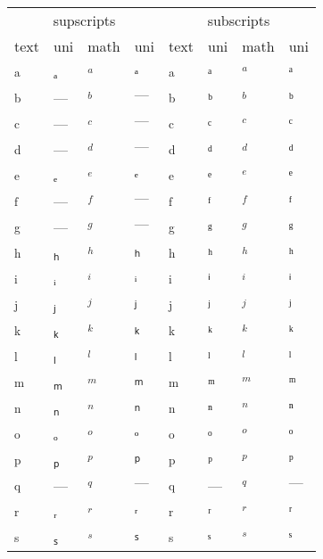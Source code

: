 \documentclass{standalone}
\begin{document}
\begin{tabular}{ll|ll|ll|ll}  %
\toprule
\multicolumn{4}{c|}{supscripts} & \multicolumn{4}{|c}{subscripts} \\
text & uni & math & uni & text & uni & math & uni \\
\midrule
\textsubscript{a} & ₐ & $_{a}$ & $ₐ$ & \textsuperscript{a} & ᵃ & $^{a}$ & $ᵃ$ \\
\textsubscript{b} & — & $_{b}$ & $—$ & \textsuperscript{b} & ᵇ & $^{b}$ & $ᵇ$ \\
\textsubscript{c} & — & $_{c}$ & $—$ & \textsuperscript{c} & ᶜ & $^{c}$ & $ᶜ$ \\
\textsubscript{d} & — & $_{d}$ & $—$ & \textsuperscript{d} & ᵈ & $^{d}$ & $ᵈ$ \\
\textsubscript{e} & ₑ & $_{e}$ & $ₑ$ & \textsuperscript{e} & ᵉ & $^{e}$ & $ᵉ$ \\
\textsubscript{f} & — & $_{f}$ & $—$ & \textsuperscript{f} & ᶠ & $^{f}$ & $ᶠ$ \\
\textsubscript{g} & — & $_{g}$ & $—$ & \textsuperscript{g} & ᵍ & $^{g}$ & $ᵍ$ \\
\textsubscript{h} & ₕ & $_{h}$ & $ₕ$ & \textsuperscript{h} & ʰ & $^{h}$ & $ʰ$ \\
\textsubscript{i} & ᵢ & $_{i}$ & $ᵢ$ & \textsuperscript{i} & ⁱ & $^{i}$ & $ⁱ$ \\
\textsubscript{j} & ⱼ & $_{j}$ & $ⱼ$ & \textsuperscript{j} & ʲ & $^{j}$ & $ʲ$ \\
\textsubscript{k} & ₖ & $_{k}$ & $ₖ$ & \textsuperscript{k} & ᵏ & $^{k}$ & $ᵏ$ \\
\textsubscript{l} & ₗ & $_{l}$ & $ₗ$ & \textsuperscript{l} & ˡ & $^{l}$ & $ˡ$ \\
\textsubscript{m} & ₘ & $_{m}$ & $ₘ$ & \textsuperscript{m} & ᵐ & $^{m}$ & $ᵐ$ \\
\textsubscript{n} & ₙ & $_{n}$ & $ₙ$ & \textsuperscript{n} & ⁿ & $^{n}$ & $ⁿ$ \\
\textsubscript{o} & ₒ & $_{o}$ & $ₒ$ & \textsuperscript{o} & ᵒ & $^{o}$ & $ᵒ$ \\
\textsubscript{p} & ₚ & $_{p}$ & $ₚ$ & \textsuperscript{p} & ᵖ & $^{p}$ & $ᵖ$ \\
\textsubscript{q} & — & $_{q}$ & $—$ & \textsuperscript{q} & — & $^{q}$ & $—$ \\
\textsubscript{r} & ᵣ & $_{r}$ & $ᵣ$ & \textsuperscript{r} & ʳ & $^{r}$ & $ʳ$ \\
\textsubscript{s} & ₛ & $_{s}$ & $ₛ$ & \textsuperscript{s} & ˢ & $^{s}$ & $ˢ$ \\

\end{tabular}
\end{document}
